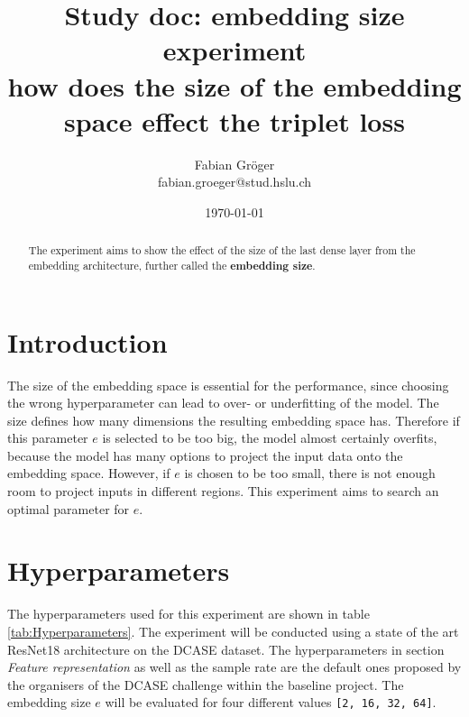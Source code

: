 \documentclass[twocolumn]{article}
\title{\huge{\textbf{Study doc: embedding size experiment}}\\ \normalsize \Large{how does the size of the embedding space effect the triplet loss}}
\author{Fabian Gröger\\fabian.groeger@stud.hslu.ch}
\date{\today}
\begin{document}
\maketitle

\begin{abstract}
The experiment aims to show the effect of the size of the last dense layer from the embedding architecture, further called the \textbf{embedding size}.
\end{abstract}

\section{Introduction}
The size of the embedding space is essential for the performance, since choosing the wrong hyperparameter can lead to over- or underfitting of the model. The size defines how many dimensions the resulting embedding space has. Therefore if this parameter $e$ is selected to be too big, the model almost certainly overfits, because the model has many options to project the input data onto the embedding space. However, if $e$ is chosen to be too small, there is not enough room to project inputs in different regions. This experiment aims to search an optimal parameter for $e$.

\section{Hyperparameters}
The hyperparameters used for this experiment are shown in table \ref{tab:Hyperparameters}. The experiment will be conducted using a state of the art ResNet18 architecture on the DCASE dataset. The hyperparameters in section \textit{Feature representation} as well as the sample rate are the default ones proposed by the organisers of the DCASE challenge within the baseline project. The embedding size $e$ will be evaluated for four different values \texttt{[2, 16, 32, 64]}.
\end{document}
